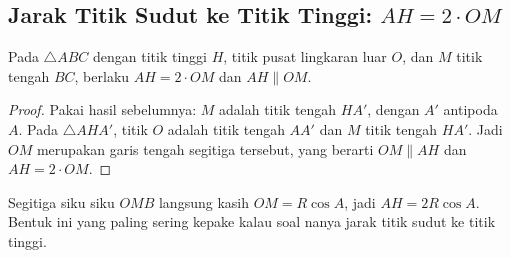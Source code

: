 \documentclass[letterpaper, 13pt]{scrartcl}
\newcommand{\titik}[1]{\foreach \p in {#1} \filldraw (\p) circle (1.4pt);}
\begin{document}
\subsection{Jarak Titik Sudut ke Titik Tinggi: $AH = 2 \cdot OM$}

\noindent
\begin{minipage}[t]{175pt}
\vspace{0pt}
\centering
{}
\end{minipage}\hfill
\begin{minipage}[t]{\dimexpr\textwidth-175pt-16pt\relax}
\vspace{0pt}
\begin{theorem*}
Pada $\triangle ABC$ dengan titik tinggi $H$, titik pusat lingkaran luar $O$, dan $M$ titik tengah $BC$, berlaku $AH = 2 \cdot OM$ dan $AH \parallel OM$.
\end{theorem*}
\end{minipage}
\par\bigskip


\begin{proof}
Pakai hasil sebelumnya: $M$ adalah titik tengah $HA'$, dengan $A'$ antipoda $A$. Pada $\triangle AHA'$, titik $O$ adalah titik tengah $AA'$ dan $M$ titik tengah $HA'$. Jadi $OM$ merupakan garis tengah segitiga tersebut, yang berarti $OM \parallel AH$ dan $AH = 2 \cdot OM$.
\end{proof}

Segitiga siku siku $OMB$ langsung kasih $OM = R\cos A$, jadi $AH = 2R\cos A$. Bentuk ini yang paling sering kepake kalau soal nanya jarak titik sudut ke titik tinggi.
\end{document}
